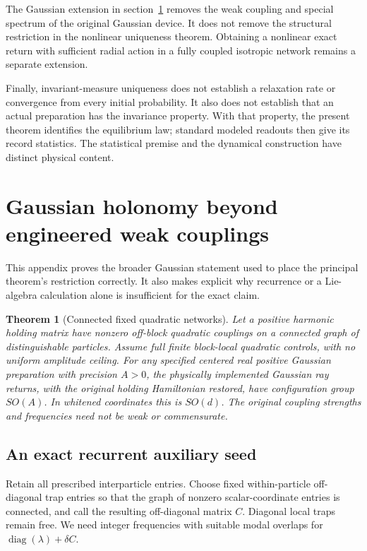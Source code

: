 \documentclass[11pt]{article}
\numberwithin{equation}{section}
\newtheorem{theorem}{Theorem}[section]
\theoremstyle{definition}
\newcommand{\diag}{\operatorname{diag}}
\begin{document}
The Gaussian extension in section~\ref{app:general} removes the weak
coupling and special spectrum of the original Gaussian device.
It does not remove the structural restriction in the nonlinear
uniqueness theorem. Obtaining a nonlinear exact return with
sufficient radial action in a fully coupled isotropic network
remains a separate extension.

Finally, invariant-measure uniqueness does not establish a
relaxation rate or convergence from every initial probability.
It also does not establish that an actual preparation has the
invariance property. With that property, the present theorem
identifies the equilibrium law; standard modeled readouts then
give its record statistics. The statistical premise and the
dynamical construction have distinct physical content.

\appendix
\section{Gaussian holonomy beyond engineered weak couplings}\label{app:general}

This appendix proves the broader Gaussian statement used to place
the principal theorem's restriction correctly. It also makes
explicit why recurrence or a Lie-algebra calculation alone is
insufficient for the exact claim.

\begin{theorem}[Connected fixed quadratic networks]\label{thm:general}
Let a positive harmonic holding matrix have nonzero off-block
quadratic couplings on a connected graph of distinguishable
particles. Assume full finite block-local quadratic controls,
with no uniform amplitude ceiling. For any specified centered
real positive Gaussian preparation with precision $A>0$, the
physically implemented Gaussian ray returns, with the original
holding Hamiltonian restored, have configuration group $SO(A)$.
In whitened coordinates this is $SO(d)$.
The original coupling strengths and frequencies need not be
weak or commensurate.
\end{theorem}

\subsection{An exact recurrent auxiliary seed}

Retain all prescribed interparticle entries. Choose fixed
within-particle off-diagonal trap entries so that the graph of
nonzero scalar-coordinate entries is connected, and call the
resulting off-diagonal matrix $C$. Diagonal local traps remain
free. We need integer frequencies with suitable modal overlaps
for $\diag(\lambda)+\delta C$.
\end{document}
